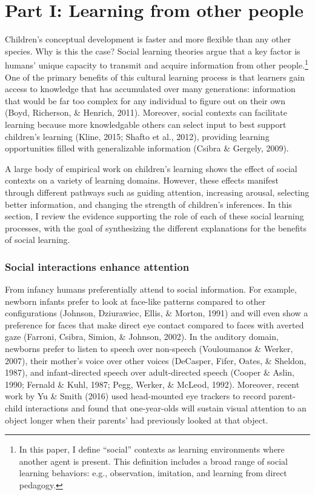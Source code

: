 \documentclass[a4paper,man,apacite,floatsintext]{apa6}
\begin{document}
\section{Part I: Learning from other
people}\label{part-i-learning-from-other-people}

Children's conceptual development is faster and more flexible than any
other species. Why is this the case? Social learning theories argue that
a key factor is humans' unique capacity to transmit and acquire
information from other people.\footnote{In this paper, I define
  ``social'' contexts as learning environments where another agent is
  present. This definition includes a broad range of social learning
  behaviors: e.g., observation, imitation, and learning from direct
  pedagogy.} One of the primary benefits of this cultural learning
process is that learners gain access to knowledge that has accumulated
over many generations: information that would be far too complex for any
individual to figure out on their own (Boyd, Richerson, \& Henrich,
2011). Moreover, social contexts can facilitate learning because more
knowledgable others can select input to best support children's learning
(Kline, 2015; Shafto et al., 2012), providing learning opportunities
filled with generalizable information (Csibra \& Gergely, 2009).

A large body of empirical work on children's learning shows the effect
of social contexts on a variety of learning domains. However, these
effects manifest through different pathways such as guiding attention,
increasing arousal, selecting better information, and changing the
strength of children's inferences. In this section, I review the
evidence supporting the role of each of these social learning processes,
with the goal of synthesizing the different explanations for the
benefits of social learning.

\subsubsection{Social interactions enhance
attention}\label{social-interactions-enhance-attention}

From infancy humans preferentially attend to social information. For
example, newborn infants prefer to look at face-like patterns compared
to other configurations (Johnson, Dziurawiec, Ellis, \& Morton, 1991)
and will even show a preference for faces that make direct eye contact
compared to faces with averted gaze (Farroni, Csibra, Simion, \&
Johnson, 2002). In the auditory domain, newborns prefer to listen to
speech over non-speech (Vouloumanos \& Werker, 2007), their mother's
voice over other voices (DeCasper, Fifer, Oates, \& Sheldon, 1987), and
infant-directed speech over adult-directed speech (Cooper \& Aslin,
1990; Fernald \& Kuhl, 1987; Pegg, Werker, \& McLeod, 1992). Moreover,
recent work by Yu \& Smith (2016) used head-mounted eye trackers to
record parent-child interactions and found that one-year-olds will
sustain visual attention to an object longer when their parents' had
previously looked at that object.
\end{document}
